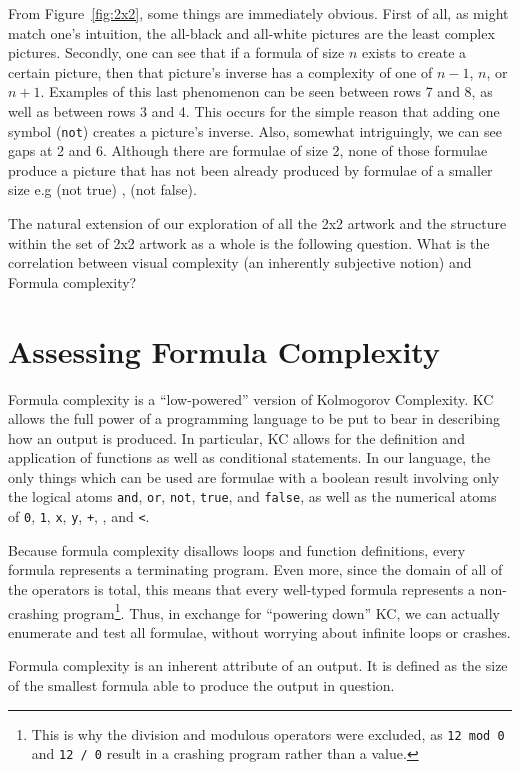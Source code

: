 From Figure~\ref{fig:2x2}, some things are immediately obvious.  First of all,
as might match one's intuition, the all-black and all-white pictures are the
least complex pictures.  Secondly, one can see that if a formula of size $n$
exists to create a certain picture, then that picture's inverse has a
complexity of one of $n-1$, $n$, or $n+1$.  Examples of this last phenomenon
can be seen between rows 7 and 8, as well as between rows 3 and 4.  This occurs
for the simple reason that adding one symbol ({\tt not}) creates a picture's
inverse.  Also, somewhat intriguingly, we can see gaps at 2 and 6.  Although
there are formulae of size 2, none of those formulae produce a picture that has
not been already produced by formulae of a smaller size e.g (not true) , (not false).


The natural extension of our exploration of all the 2x2 artwork and the structure within the set of 2x2 artwork as a whole is the following question. What is the correlation between visual complexity (an inherently subjective notion) and
Formula complexity?  

\section{Assessing Formula Complexity}
Formula complexity is a ``low-powered'' version of Kolmogorov Complexity.  KC
allows the full power of a programming language to be put to bear in describing
how an output is produced.  In particular, KC allows for the definition and
application of functions as well as conditional statements.  In our language,
the only things which can be used are formulae with a boolean result
involving only the logical atoms {\tt and}, {\tt or}, {\tt not}, {\tt true},
and {\tt false}, as well as the numerical atoms of {\tt 0}, {\tt 1}, {\tt x},
{\tt y}, {\tt +}, {\tt *}, and {\tt <}.

Because formula complexity disallows loops and function definitions, every
formula represents a terminating program.  Even more, since the domain of all
of the operators is total, this means that every well-typed formula represents
a non-crashing program\footnote{This is why the division and modulous operators
were excluded, as {\tt 12 mod 0} and {\tt 12 / 0} result in a crashing program
rather than a value.}.  Thus, in exchange for ``powering down'' KC, we can
actually enumerate and test all formulae, without worrying about infinite loops
or crashes.



Formula complexity is an inherent attribute of an output. 
It is defined as the size of the smallest formula able to produce the output in question. 

